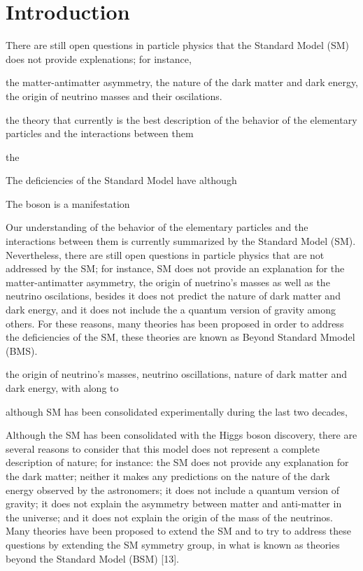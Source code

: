 \chapter*{Introduction}

There are still open questions in particle physics that the Standard Model (SM) does 
not provide explenations; for instance, 

the matter-antimatter asymmetry, the nature of the dark matter and dark energy,
the origin of neutrino masses and their oscilations. 

the theory that currently is the best 
description of the behavior of the elementary particles and the interactions between them


the 



The deficiencies of the Standard Model have 
although



The \Zprime boson is a manifestation 


Our understanding of the behavior of the elementary particles and the interactions between them is 
currently summarized by the Standard Model (SM). Nevertheless, there are still open 
questions in particle physics that are not addressed by the SM; for instance, SM does 
not provide an explanation for the matter-antimatter asymmetry, the origin of nuetrino's masses as well as the 
neutrino oscilations, besides it does not predict the nature of dark matter and dark energy,
and it does not include the a quantum version of gravity among others. For these reasons, many theories has been proposed 
in order to address the deficiencies of the SM, these theories are known as Beyond Standard Mmodel (BMS).



the origin of neutrino's masses, 
neutrino oscillations, nature of dark matter and dark energy, with along to 


although SM has been consolidated experimentally during the last two decades, 




Although the SM has been consolidated with the Higgs boson discovery, there are several reasons
to consider that this model does not represent a complete description of nature; for instance: the SM
does not provide any explanation for the dark matter; 
neither it makes any predictions on the nature of the dark energy observed by the astronomers; 
it does not include a quantum version of gravity; it does
not explain the asymmetry between matter and anti-matter in the universe; and it does not explain
the origin of the mass of the neutrinos. Many theories have been proposed to extend the SM and to try
to address these questions by extending the SM symmetry group, in what is known as theories beyond
the Standard Model (BSM) [13].

